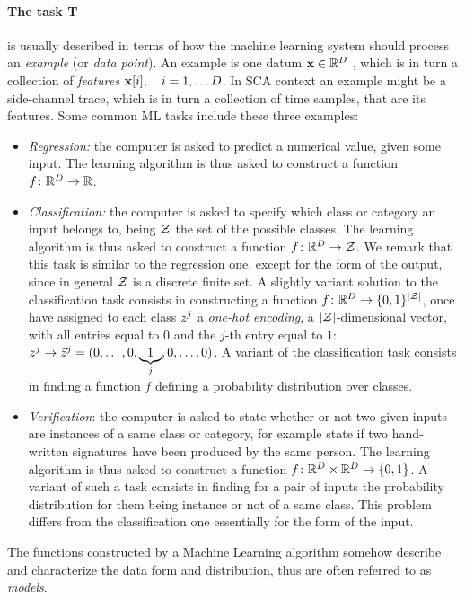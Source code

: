 \paragraph*{The task T} is usually described in terms of how the machine learning system should process an \emph{example} (or \emph{data point}). An example is one datum $\textbf{x}\in \mathbb{R}^D$ , which is in turn a collection of \emph{features} $\textbf{x}[i], \quad i=1,\dots D$. In SCA context an example might be a side-channel trace, which is in turn a collection of time samples, that are its features. Some common ML tasks include these three examples: 
\begin{itemize}
\item \emph{Regression: } the computer is asked to predict a numerical value, given some input. The learning algorithm is thus asked to construct a function $f\colon \mathbb{R}^D \rightarrow \mathbb{R}$.
\item \emph{Classification: } the computer is asked to specify which class or category an input belongs to, being $\mathcal{Z}$ the set of the possible classes. The learning algorithm is thus asked to construct a function $f\colon \mathbb{R}^D \rightarrow \mathcal{Z}$. We remark that this task is similar to the regression one, except for the form of the output, since in general $\mathcal{Z}$ is a discrete finite set. A slightly variant solution to the classification task consists in constructing a function $f\colon \mathbb{R}^D \rightarrow \{0,1\}^{\lvert\mathcal{Z}\rvert}$, once have assigned to each class $z^j$ a \emph{one-hot encoding}, \ie  a $\lvert\mathcal{Z}\rvert$-dimensional vector,
with all entries equal to $0$ and the $j$-th entry equal to $1$: $z^j
\rightarrow \vec{z}^j = (0,\ldots , 0,\underbrace{1}_{j},0,\dots,0)$. A variant of the classification task consists in finding a function $f$ defining a probability distribution over classes.
\item \emph{Verification}: the computer is asked to state whether or not two given inputs are instances of a same class or category, for example state if two hand-written signatures have been produced by the same person. The learning algorithm is thus asked to construct a function $f\colon \mathbb{R}^D \times \mathbb{R}^{D}\rightarrow \{0,1\}$. A variant of such a task consists in finding for a pair of inputs the probability distribution for them being instance or not of a same class. This problem differs from the classification one essentially for the form of the input.
\end{itemize}
The functions constructed by a Machine Learning algorithm somehow describe and characterize the data form and distribution, thus are often referred to as \emph{models}.

